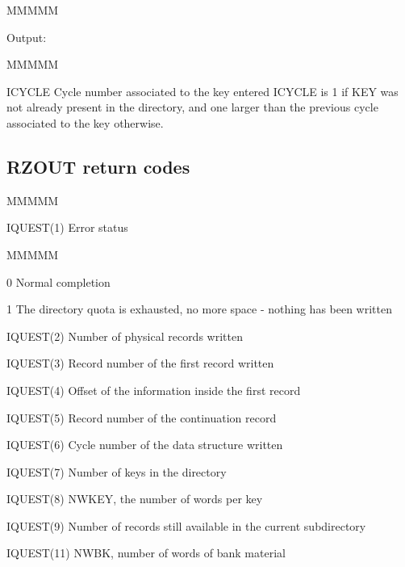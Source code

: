 \begin{DL}{MMMMM}
\item[Output:
]
\begin{DL}{MMMMM}
\item[ICYCLE
]Cycle number associated to the key entered
\newline ICYCLE is 1 if KEY was not already present in the directory, and
one larger than the previous cycle associated to the key otherwise.
\end{DL}
\end{DL}
\subsection{RZOUT return codes}
\begin{DL}{MMMMM}
\item[IQUEST(1)
]Error status
\begin{DL}{MMMMM}
\item[0
]Normal completion
\item[1
]The directory quota is exhausted, no more space
- nothing has been written
\end{DL}
\item[IQUEST(2)
]Number of physical records written
\item[IQUEST(3)
]Record number of the first record written
\item[IQUEST(4)
]Offset of the information inside the first record
\item[IQUEST(5)
]Record number of the continuation record
\item[IQUEST(6)
]Cycle number of the data structure written
\item[IQUEST(7)
]Number of keys in the directory
\item[IQUEST(8)
]NWKEY, the number of words per key
\item[IQUEST(9)
]Number of records still available in the current subdirectory
\par
\item[IQUEST(11)
]NWBK, number of words of bank material
\end{DL}
